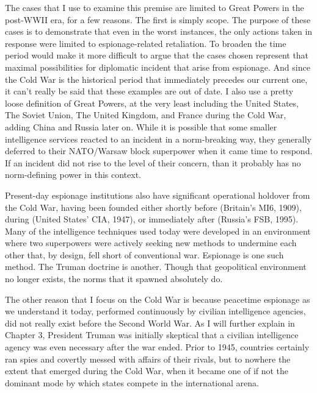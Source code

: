 \documentclass{memoir}
\begin{document}
\begin{refsegment}
The cases that I use to examine this premise are limited to Great Powers in the post-WWII era, for a few reasons. The first is simply scope. The purpose of these cases is to demonstrate that even in the worst instances, the only actions taken in response were limited to espionage-related retaliation. To broaden the time period would make it more difficult to argue that the cases chosen represent that maximal possibilities for diplomatic incident that arise from espionage. And since the Cold War is the historical period that immediately precedes our current one, it can't really be said that these examples are out of date. I also use a pretty loose definition of Great Powers, at the very least including the United States, The Soviet Union, The United Kingdom, and France during the Cold War, adding China and Russia later on. While it is possible that some smaller intelligence services reacted to an incident in a norm-breaking way, they generally deferred to their NATO/Warsaw block superpower when it came time to respond. If an incident did not rise to the level of their concern, than it probably has no norm-defining power in this context.

Present-day espionage institutions also have significant operational holdover from the Cold War, having been founded either shortly before (Britain's MI6, 1909), during (United States' CIA, 1947), or immediately after (Russia's FSB, 1995). Many of the intelligence techniques used today were developed in an environment where two superpowers were actively seeking new methods to undermine each other that, by design, fell short of conventional war. Espionage is one such method. The Truman doctrine is another. Though that geopolitical environment no longer exists, the norms that it spawned absolutely do.

The other reason that I focus on the Cold War is because peacetime espionage as we understand it today, performed continuously by civilian intelligence agencies, did not really exist before the Second World War. As I will further explain in Chapter 3, President Truman was initially skeptical that a civilian intelligence agency was even necessary after the war ended. Prior to 1945, countries certainly ran spies and covertly messed with affairs of their rivals, but to nowhere the extent that emerged during the Cold War, when it became one of if not the dominant mode by which states compete in the international arena.


\end{refsegment}
\end{document}
